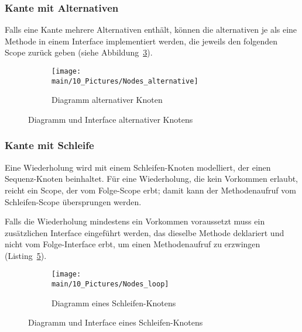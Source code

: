 \documentclass[../InterneDSLs.tex]{subfiles}
\begin{document}
\subsubsection{Kante mit Alternativen}
Falls eine Kante mehrere Alternativen enthält, können die alternativen je als eine Methode in einem Interface implementiert werden, die jeweils den folgenden Scope zurück geben (siehe Abbildung~\ref{FIG:AlternativeNode}).
\begin{figure}[ht]
\centering
  \begin{subfigure}[c]{0.49\textwidth}
    \texttt{[image: \\main/10\_Pictures/Nodes\_alternative]}
    \caption{Diagramm alternativer Knoten}
    \label{FIG:DiagramAlternativeNode}
  \end{subfigure}
  \begin{subfigure}[c]{0.49\textwidth}
    
    \label{FIG:JInterfaceAlternativeNode}
  \end{subfigure}
  \caption{Diagramm und Interface alternativer Knotens}
  \label{FIG:AlternativeNode}
\end{figure}

\subsubsection{Kante mit Schleife}
Eine Wiederholung wird mit einem Schleifen-Knoten modelliert, der einen Sequenz-Knoten beinhaltet. Für eine Wiederholung, die kein Vorkommen erlaubt, reicht ein Scope, der vom Folge-Scope erbt; damit kann der Methodenaufruf vom Schleifen-Scope übersprungen werden.

Falls die Wiederholung mindestens ein Vorkommen voraussetzt muss ein zusätzlichen Interface eingeführt werden, das dieselbe Methode deklariert und nicht vom Folge-Interface erbt, um einen Methodenaufruf zu erzwingen (Listing~\ref{FIG:JInterfaceLoopNode}).
\begin{figure}[ht]
\centering
  \begin{subfigure}[c]{0.49\textwidth}
    \texttt{[image: \\main/10\_Pictures/Nodes\_loop]}
    \caption{Diagramm eines Schleifen-Knotens}
    \label{FIG:DiagramLoopNode}
  \end{subfigure}
  \begin{subfigure}[c]{0.49\textwidth}
    
    \label{FIG:JInterfaceLoopNode}
  \end{subfigure}
  \caption{Diagramm und Interface eines Schleifen-Knotens}
  \label{FIG:LoopNode}
\end{figure}
\end{document}
